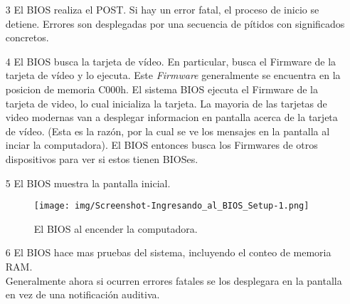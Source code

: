 \begin{enumerate}
		\item[3] El BIOS realiza el POST. Si hay un error fatal, el proceso de
			inicio se detiene. Errores son desplegadas por una secuencia de
			pítidos con significados concretos.
	

		\item[4] El BIOS busca la tarjeta de vídeo. En particular, busca el
			Firmware de la tarjeta de vídeo y lo ejecuta. Este {\em Firmware}
			generalmente se encuentra en la posicion de memoria C000h.  El
			sistema BIOS ejecuta el Firmware de la tarjeta de video, lo cual
			inicializa la tarjeta. La mayoria de las tarjetas de video modernas
			van a desplegar informacion en pantalla acerca de la tarjeta de
			vídeo. (Esta es la razón, por la cual se ve los mensajes en la
			pantalla al inciar la computadora). El BIOS entonces busca los
			Firmwares de otros dispositivos para ver si estos tienen BIOSes.
				
		\item[5] El BIOS muestra la pantalla inicial.
			\begin{figure}[H]
				\centering
					\texttt{[image: img/Screenshot-Ingresando\_al\_BIOS\_Setup-1.png]}
				\caption{El BIOS al encender la computadora.}
			\end{figure}
	

		\item[6] El BIOS hace mas pruebas del sistema, incluyendo el conteo de memoria
			RAM. \\
			Generalmente ahora si ocurren errores fatales se los desplegara en la
			pantalla en vez de una notificación auditiva.


\end{enumerate}
